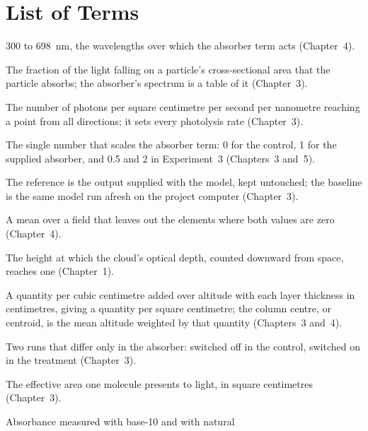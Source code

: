 \chapter*{List of Terms}
{}

{
\begin{description}[leftmargin=0pt, itemsep=3pt]
  \item[Absorber grid.] 300 to 698~nm, the wavelengths over which the absorber term acts
    (Chapter~4).
  \item[Absorption efficiency, $Q_{\mathrm{abs}}$.] The fraction of the light falling on a
    particle's cross-sectional area that the particle absorbs; the absorber's spectrum is a
    table of it (Chapter~3).
  \item[Actinic flux.] The number of photons per square centimetre per second per
    nanometre reaching a point from all directions; it sets every photolysis rate
    (Chapter~3).
  \item[Amplitude, $A_{\mathrm{UUV}}$.] The single number that scales the absorber term:
    0 for the control, 1 for the supplied absorber, and 0.5 and 2 in Experiment~3
    (Chapters~3 and~5).
  \item[Baseline and reference.] The reference is the output supplied with the model,
    kept untouched; the baseline is the same model run afresh on the project computer
    (Chapter~3).
  \item[Bounded mean.] A mean over a field that leaves out the elements where both values
    are zero (Chapter~4).
  \item[Cloud top.] The height at which the cloud's optical depth, counted downward from
    space, reaches one (Chapter~1).
  \item[Column and column centre.] A quantity per cubic centimetre added over altitude
    with each layer thickness in centimetres, giving a quantity per square centimetre; the
    column centre, or centroid, is the mean altitude weighted by that quantity (Chapters~3
    and~4).
  \item[Control and treatment.] Two runs that differ only in the absorber: switched off
    in the control, switched on in the treatment (Chapter~3).
  \item[Cross section.] The effective area one molecule presents to light, in square
    centimetres (Chapter~3).
  \item[Decadic and Napierian.] Absorbance measured with base-10 and with natural

\end{description}}
